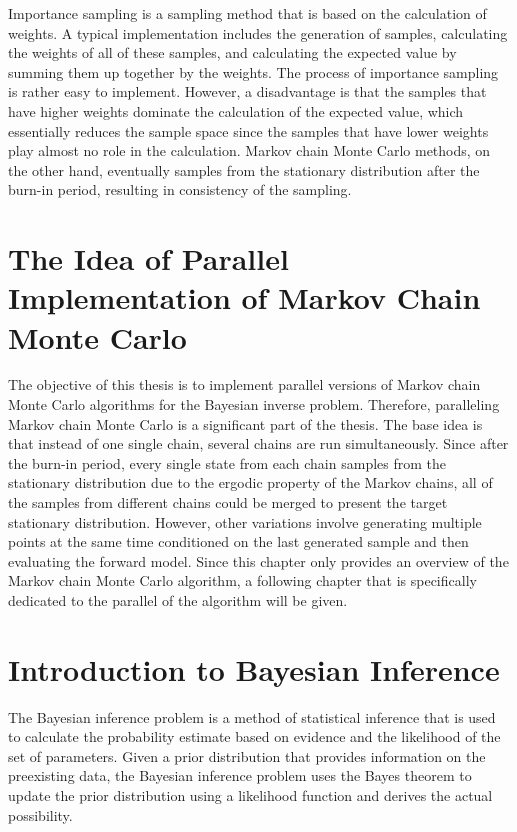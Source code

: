 Importance sampling is a sampling method that is based on the calculation of weights. A typical implementation includes the generation of samples, calculating the weights of all of these samples, and calculating the expected value by summing them up together by the weights.\cite{ImportanceSampling} The process of importance sampling is rather easy to implement. However, a disadvantage is that the samples that have higher weights dominate the calculation of the expected value, which essentially reduces the sample space since the samples that have lower weights play almost no role in the calculation. Markov chain Monte Carlo methods, on the other hand, eventually samples from the stationary distribution after the burn-in period, resulting in consistency of the sampling.\cite{ComparisonSampling}

\section{The Idea of Parallel Implementation of Markov Chain Monte Carlo}
The objective of this thesis is to implement parallel versions of Markov chain Monte Carlo algorithms for the Bayesian inverse problem. Therefore, paralleling Markov chain Monte Carlo is a significant part of the thesis. The base idea is that instead of one single chain, several chains are run simultaneously.\cite{base_parallel} Since after the burn-in period, every single state from each chain samples from the stationary distribution due to the ergodic property of the Markov chains,\cite{ergodicity} all of the samples from different chains could be merged to present the target stationary distribution. However, other variations involve generating multiple points at the same time conditioned on the last generated sample and then evaluating the forward model.\cite{gpmh_broshure} Since this chapter only provides an overview of the Markov chain Monte Carlo algorithm, a following chapter that is specifically dedicated to the parallel of the algorithm will be given.

\section{Introduction to Bayesian Inference}
The Bayesian inference problem is a method of statistical inference that is used to calculate the probability estimate based on evidence and the likelihood of the set of parameters.\cite{bayesian_inference} Given a prior distribution that provides information on the preexisting data, the Bayesian inference problem uses the Bayes theorem to update the prior distribution using a likelihood function and derives the actual possibility.

